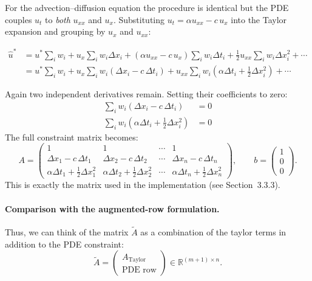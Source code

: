 \documentclass[12pt, a4paper, twoside]{report}
\theoremstyle{plain}
\theoremstyle{definition}
\begin{document}
For the advection--diffusion equation the procedure is identical but the PDE
couples $u_t$ to \emph{both} $u_{xx}$ and $u_x$.
Substituting $u_t = \alpha u_{xx} - c\, u_x$ into the Taylor expansion and
grouping by $u_x$ and $u_{xx}$:

\begin{align}
    \hat{u}^* &= u^* \sum_i w_i
    + u_x \sum_i w_i \Delta x_i
    + (\alpha u_{xx} - c\, u_x) \sum_i w_i \Delta t_i
    + \tfrac{1}{2} u_{xx} \sum_i w_i \Delta x_i^2
    + \cdots \\
    &= u^* \sum_i w_i
    + u_x    \sum_i w_i \!\left(\Delta x_i - c\, \Delta t_i\right)
    + u_{xx} \sum_i w_i \!\left(\alpha \Delta t_i + \tfrac{1}{2}\Delta x_i^2\right)
    + \cdots
\end{align}

Again two independent derivatives remain.
Setting their coefficients to zero:
\begin{align}
    \sum_i w_i \!\left(\Delta x_i - c\, \Delta t_i\right) &= 0
    \label{eq:adv_row2}\\
    \sum_i w_i \!\left(\alpha \Delta t_i + \tfrac{1}{2}\Delta x_i^2\right) &= 0
    \label{eq:adv_row3}
\end{align}
The full constraint matrix becomes:
\begin{equation}
    A = \begin{pmatrix}
        1 & 1 & \cdots & 1 \\
        \Delta x_1 - c\,\Delta t_1
        & \Delta x_2 - c\,\Delta t_2
        & \cdots
        & \Delta x_n - c\,\Delta t_n \\
        \alpha \Delta t_1 + \tfrac{1}{2}\Delta x_1^2
        & \alpha \Delta t_2 + \tfrac{1}{2}\Delta x_2^2
        & \cdots
        & \alpha \Delta t_n + \tfrac{1}{2}\Delta x_n^2
    \end{pmatrix},
    \qquad
    b = \begin{pmatrix} 1 \\ 0 \\ 0 \end{pmatrix}.
\end{equation}
This is exactly the matrix used in the implementation (see Section~3.3.3).

\paragraph{Comparison with the augmented-row formulation.}
Thus, we can think of the matrix $\tilde{A}$ as a combination of the taylor terms in addition to the PDE constraint:
\begin{equation}
    \tilde{A} = \begin{pmatrix} A_{\text{Taylor}} \\ \text{PDE row} \end{pmatrix}
    \in \mathbb{R}^{(m+1)\times n}.
\end{equation} 
\end{document}
